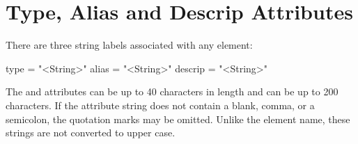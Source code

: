\begin{table}[ht]
\caption {Example normalized and unnormalized field strength attributes.}
\label{t:dep.field}
\end{table}

\section{Type, Alias and Descrip Attributes}
\label{s:alias}

There are three string labels associated with any element:
\begin{example}
  type    = "<String>"
  alias   = "<String>"
  descrip = "<String>"
\end{example}
The  and  attributes can be up to 40 characters in length and  can be
up to 200 characters. If the attribute string does not contain a blank, comma, or a semicolon, the
quotation marks may be omitted. Unlike the element name, these strings are not converted to upper case.

